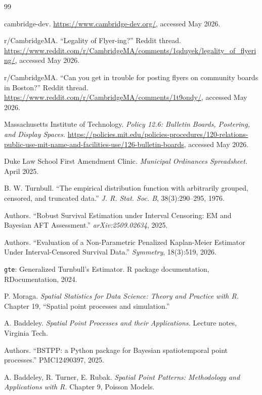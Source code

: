 \documentclass[sigconf,nonacm]{acmart}
\begin{document}
\begin{thebibliography}{99}

cambridge-dev. \url{https://www.cambridge-dev.org/}, accessed May 2026.

r/CambridgeMA. ``Legality of Flyer-ing?'' Reddit thread. \url{https://www.reddit.com/r/CambridgeMA/comments/1qduyek/legality_of_flyering/}, accessed May 2026.

r/CambridgeMA. ``Can you get in trouble for posting flyers on community boards in Boston?'' Reddit thread. \url{https://www.reddit.com/r/CambridgeMA/comments/1t9ondy/}, accessed May 2026.

Massachusetts Institute of Technology. \emph{Policy 12.6: Bulletin Boards, Postering, and Display Spaces.} \url{https://policies.mit.edu/policies-procedures/120-relations-public-use-mit-name-and-facilities-use/126-bulletin-boards}, accessed May 2026.

Duke Law School First Amendment Clinic. \emph{Municipal Ordinances Spreadsheet.} April 2025.

B. W. Turnbull. ``The empirical distribution function with arbitrarily grouped, censored, and truncated data.'' \emph{J. R. Stat. Soc. B}, 38(3):290--295, 1976.

Authors. ``Robust Survival Estimation under Interval Censoring: EM and Bayesian AFT Assessment.'' \emph{arXiv:2509.02634}, 2025.

Authors. ``Evaluation of a Non-Parametric Penalized Kaplan-Meier Estimator Under Interval-Censored Survival Data.'' \emph{Symmetry}, 18(3):519, 2026.

\texttt{gte}: Generalized Turnbull's Estimator. R package documentation, RDocumentation, 2024.

P. Moraga. \emph{Spatial Statistics for Data Science: Theory and Practice with R.} Chapter 19, ``Spatial point processes and simulation.''

A. Baddeley. \emph{Spatial Point Processes and their Applications.} Lecture notes, Virginia Tech.

Authors. ``BSTPP: a Python package for Bayesian spatiotemporal point processes.'' PMC12490397, 2025.

A. Baddeley, R. Turner, E. Rubak. \emph{Spatial Point Patterns: Methodology and Applications with R.} Chapter 9, Poisson Models.


\end{thebibliography}
\end{document}
